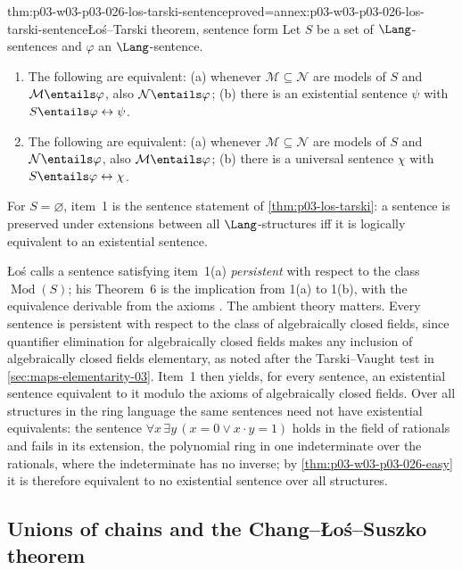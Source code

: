 \begin{hbtheorem}{thm:p03-w03-p03-026-los-tarski-sentence}{proved=annex:p03-w03-p03-026-los-tarski-sentence}{\L o\'s--Tarski theorem, sentence form}
Let \(S\) be a set of \(\Lang\)-sentences and \(\varphi\) an
\(\Lang\)-sentence.
\begin{enumerate}
 \item The following are equivalent: (a) whenever
       \(\mathcal M\subseteq\mathcal N\) are models of \(S\) and
       \(\mathcal M\entails\varphi\), also \(\mathcal N\entails\varphi\);
       (b) there is an existential sentence \(\psi\) with
       \(S\entails\varphi\leftrightarrow\psi\).
 \item The following are equivalent: (a) whenever
       \(\mathcal M\subseteq\mathcal N\) are models of \(S\) and
       \(\mathcal N\entails\varphi\), also \(\mathcal M\entails\varphi\);
       (b) there is a universal sentence \(\chi\) with
       \(S\entails\varphi\leftrightarrow\chi\).
\end{enumerate}
For \(S=\varnothing\), item~1 is the sentence statement of
\cref{thm:p03-los-tarski}: a sentence is preserved under extensions between
all \(\Lang\)-structures iff it is logically equivalent to an existential
sentence.
\end{hbtheorem}

\L o\'s calls a sentence satisfying item~1(a) \emph{persistent} with respect
to the class \(\operatorname{Mod}(S)\); his Theorem~6 is the implication from
1(a) to 1(b), with the equivalence derivable from the axioms
\cite[p.~48]{Los1955}.  The ambient theory matters.  Every sentence is
persistent with respect to the class of algebraically closed fields, since
quantifier elimination for algebraically closed fields makes any inclusion
of algebraically closed fields elementary, as noted after the
Tarski--Vaught test in \cref{sec:maps-elementarity-03}.  Item~1 then yields, for every sentence, an
existential sentence equivalent to it modulo the axioms of algebraically
closed fields.  Over all structures in the ring language the same sentences
need not have existential equivalents: the sentence
\(\forall x\,\exists y\,(x=0\lor x\cdot y=1)\) holds in the field of
rationals and fails in its extension, the polynomial ring in one
indeterminate over the rationals, where the indeterminate has no inverse; by
\cref{thm:p03-w03-p03-026-easy} it is therefore equivalent to no existential
sentence over all structures.

\subsection{Unions of chains and the Chang--\L o\'s--Suszko theorem}
\label{sec:p03-w03-p03-026-chang-los-suszko}

